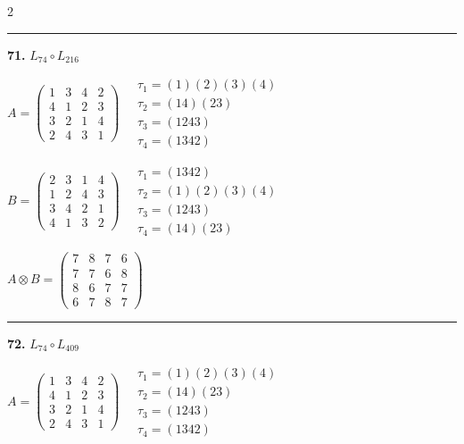 \begin{multicols}{2}
\vspace{0.3em}
\hrule
\vspace{0.3em}

\noindent\textbf{71.} $L_{74} \circ L_{216}$

$A = \begin{pmatrix} 1 & 3 & 4 & 2 \\ 4 & 1 & 2 & 3 \\ 3 & 2 & 1 & 4 \\ 2 & 4 & 3 & 1 \end{pmatrix} \quad \begin{matrix} \tau_{1}=(1)(2)(3)(4) \\ \tau_{2}=(1 4)(2 3) \\ \tau_{3}=(1 2 4 3) \\ \tau_{4}=(1 3 4 2) \end{matrix}$

$B = \begin{pmatrix} 2 & 3 & 1 & 4 \\ 1 & 2 & 4 & 3 \\ 3 & 4 & 2 & 1 \\ 4 & 1 & 3 & 2 \end{pmatrix} \quad \begin{matrix} \tau_{1}=(1 3 4 2) \\ \tau_{2}=(1)(2)(3)(4) \\ \tau_{3}=(1 2 4 3) \\ \tau_{4}=(1 4)(2 3) \end{matrix}$

$A \otimes B = \begin{pmatrix} 7 & 8 & 7 & 6 \\ 7 & 7 & 6 & 8 \\ 8 & 6 & 7 & 7 \\ 6 & 7 & 8 & 7 \end{pmatrix}$

\vspace{0.3em}
\hrule
\vspace{0.3em}

\noindent\textbf{72.} $L_{74} \circ L_{409}$

$A = \begin{pmatrix} 1 & 3 & 4 & 2 \\ 4 & 1 & 2 & 3 \\ 3 & 2 & 1 & 4 \\ 2 & 4 & 3 & 1 \end{pmatrix} \quad \begin{matrix} \tau_{1}=(1)(2)(3)(4) \\ \tau_{2}=(1 4)(2 3) \\ \tau_{3}=(1 2 4 3) \\ \tau_{4}=(1 3 4 2) \end{matrix}$


\end{multicols}
